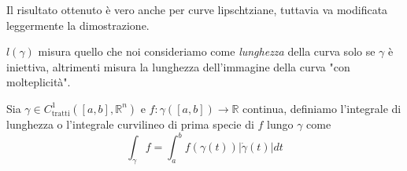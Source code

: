 \begin{remark}
Il risultato ottenuto è vero anche per curve lipschtziane, tuttavia va modificata leggermente la dimostrazione.
\end{remark}

\begin{remark}
$l(\gamma)$ misura quello che noi consideriamo come \emph{lunghezza} della curva solo se $\gamma$ è iniettiva, altrimenti misura la lunghezza dell'immagine della curva "con molteplicità".
\end{remark}

\vspace{0.5cm}
\begin{definition}[\textcolor{blue}{Integrale curvilineo di prima specie}]
	Sia $\gamma \in C^1_{\text{tratti}}([a,b], \mathbb{R}^n)$ e $f: \gamma([a,b]) \to \mathbb{R}$ continua, definiamo l'integrale di lunghezza o l'integrale curvilineo di prima specie di $f$ lungo $\gamma$ come
	$$
		\int_{\gamma} f = \int_a^b f(\gamma(t))|\dot{\gamma}(t)|dt
	$$
\end{definition}






